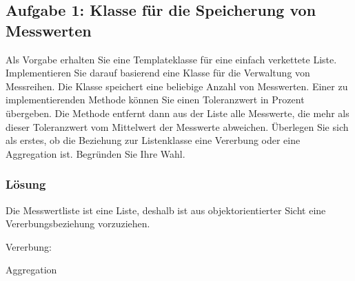 \subsection{Aufgabe 1: Klasse für die Speicherung von Messwerten}
Als Vorgabe erhalten Sie eine Templateklasse für eine einfach verkettete Liste. Implementieren Sie darauf basierend eine Klasse für die Verwaltung von Messreihen. Die Klasse speichert eine beliebige Anzahl von Messwerten. Einer zu implementierenden Methode können Sie einen Toleranzwert in Prozent übergeben. Die Methode entfernt dann aus der Liste alle Messwerte, die mehr als dieser Toleranzwert vom Mittelwert der Messwerte abweichen.
Überlegen Sie sich als erstes, ob die Beziehung zur Listenklasse eine Vererbung oder eine Aggregation ist. Begründen Sie Ihre Wahl.

\subsubsection{Lösung}
Die Messwertliste ist eine Liste, deshalb ist aus objektorientierter Sicht eine Vererbungsbeziehung vorzuziehen.

\large{Vererbung:}

\noindent\makebox[\linewidth]{\rule{\paperwidth}{0.4pt}}

\noindent\makebox[\linewidth]{\rule{\paperwidth}{0.4pt}}

\noindent\makebox[\linewidth]{\rule{\paperwidth}{0.4pt}}


\large{Aggregation}

\noindent\makebox[\linewidth]{\rule{\paperwidth}{0.4pt}}

\noindent\makebox[\linewidth]{\rule{\paperwidth}{0.4pt}}

\noindent\makebox[\linewidth]{\rule{\paperwidth}{0.4pt}}


